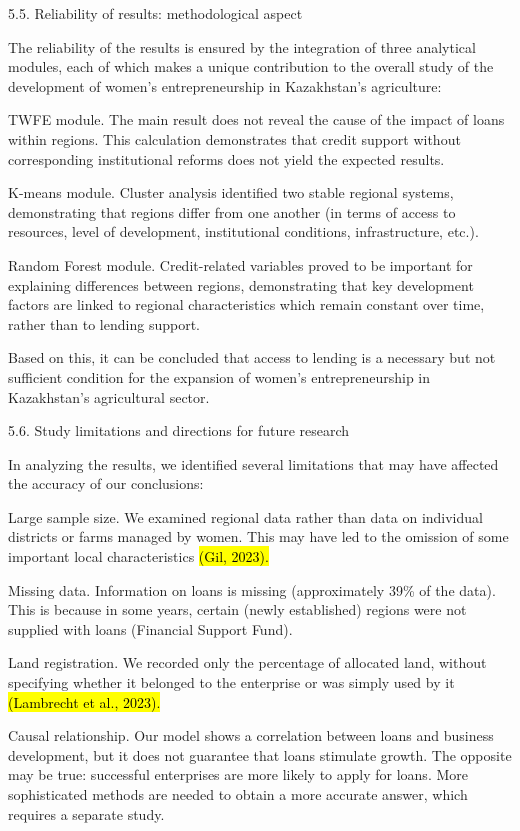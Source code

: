 5.5. Reliability of results: methodological aspect

The reliability of the results is ensured by the integration of three
analytical modules, each of which makes a unique contribution to the
overall study of the development of women's entrepreneurship in
Kazakhstan's agriculture:

TWFE module. The main result does not reveal the cause of the impact of
loans within regions. This calculation demonstrates that credit support
without corresponding institutional reforms does not yield the expected
results.

K-means module. Cluster analysis identified two stable regional systems,
demonstrating that regions differ from one another (in terms of access
to resources, level of development, institutional conditions,
infrastructure, etc.).

Random Forest module. Credit-related variables proved to be important
for explaining differences between regions, demonstrating that key
development factors are linked to regional characteristics which remain
constant over time, rather than to lending support.

Based on this, it can be concluded that access to lending is a necessary
but not sufficient condition for the expansion of women's
entrepreneurship in Kazakhstan's agricultural sector.

5.6. Study limitations and directions for future research

In analyzing the results, we identified several limitations that may
have affected the accuracy of our conclusions:

Large sample size. We examined regional data rather than data on
individual districts or farms managed by women. This may have led to the
omission of some important local characteristics \hl{(Gil, 2023).}

Missing data. Information on loans is missing (approximately 39\% of the
data). This is because in some years, certain (newly established)
regions were not supplied with loans (Financial Support Fund).

Land registration. We recorded only the percentage of allocated land,
without specifying whether it belonged to the enterprise or was simply
used by it \hl{(Lambrecht et al., 2023).}

Causal relationship. Our model shows a correlation between loans and
business development, but it does not guarantee that loans stimulate
growth. The opposite may be true: successful enterprises are more likely
to apply for loans. More sophisticated methods are needed to obtain a
more accurate answer, which requires a separate study.

